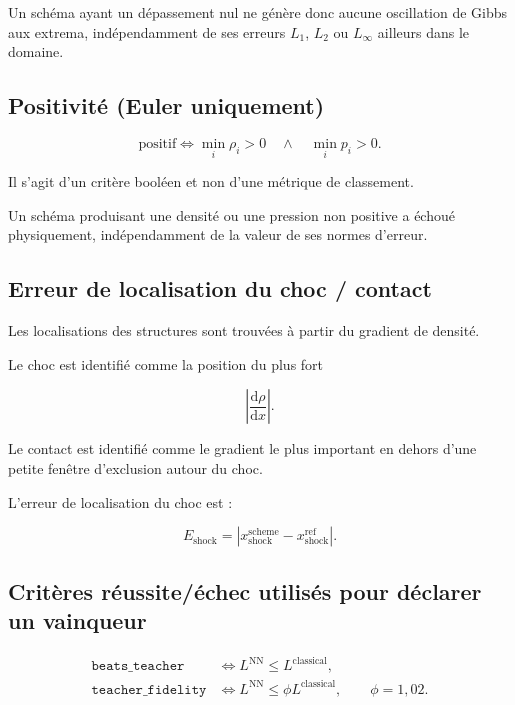 \documentclass[11pt]{article}
\begin{document}
Un schéma ayant un dépassement nul ne génère donc aucune oscillation
de Gibbs aux extrema, indépendamment de ses erreurs
$L_1$, $L_2$ ou $L_\infty$ ailleurs dans le domaine.


\subsection{Positivité (Euler uniquement)}

\begin{equation}
\text{positif}
\iff
\min_i \rho_i > 0
\quad\wedge\quad
\min_i p_i > 0.
\end{equation}

Il s'agit d'un critère booléen et non d'une métrique de classement.

Un schéma produisant une densité ou une pression non positive a échoué
physiquement, indépendamment de la valeur de ses normes d'erreur.


\subsection{Erreur de localisation du choc / contact}

Les localisations des structures sont trouvées à partir du gradient
de densité.

Le choc est identifié comme la position du plus fort

\[
\left|
\frac{\mathrm{d}\rho}{\mathrm{d}x}
\right|.
\]

Le contact est identifié comme le gradient le plus important en dehors
d'une petite fenêtre d'exclusion autour du choc.

L'erreur de localisation du choc est :

\begin{equation}
E_{\text{shock}}
=
\left|
x_{\text{shock}}^{\text{scheme}}
-
x_{\text{shock}}^{\text{ref}}
\right|.
\end{equation}


\subsection{Critères réussite/échec utilisés pour déclarer un vainqueur}

\begin{align}
\texttt{beats\_teacher}
&\iff
L^{\text{NN}}
\le
L^{\text{classical}},
\\
\texttt{teacher\_fidelity}
&\iff
L^{\text{NN}}
\le
\phi
L^{\text{classical}},
\qquad
\phi = 1{,}02.
\end{align}
\end{document}
